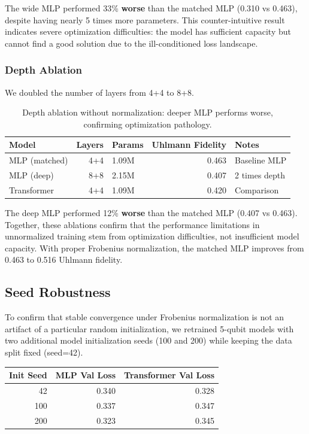 \documentclass[11pt]{article}
\begin{document}
The wide MLP performed 33\% \textbf{worse} than the matched MLP (0.310 vs 0.463), despite having nearly 5 times more parameters. This counter-intuitive result indicates severe optimization difficulties: the model has sufficient capacity but cannot find a good solution due to the ill-conditioned loss landscape.
\subsubsection{Depth Ablation}
\label{sec:orgd9ea408}

We doubled the number of layers from 4+4 to 8+8.

\begin{table}[htbp]
\caption{\label{tab:org05a20d6}Depth ablation without normalization: deeper MLP performs worse, confirming optimization pathology.}
\centering
\begin{tabular}{lrlrl}
Model & Layers & Params & Uhlmann Fidelity & Notes\\
\hline
MLP (matched) & 4+4 & 1.09M & 0.463 & Baseline MLP\\
MLP (deep) & 8+8 & 2.15M & 0.407 & 2 times depth\\
Transformer & 4+4 & 1.09M & 0.420 & Comparison\\
\end{tabular}
\end{table}

The deep MLP performed 12\% \textbf{worse} than the matched MLP (0.407 vs 0.463). Together, these ablations confirm that the performance limitations in unnormalized training stem from optimization difficulties, not insufficient model capacity. With proper Frobenius normalization, the matched MLP improves from 0.463 to 0.516 Uhlmann fidelity.
\subsection{Seed Robustness}
\label{sec:org8323e8f}
To confirm that stable convergence under Frobenius normalization is not an artifact of a particular random initialization, we retrained 5-qubit models with two additional model initialization seeds (100 and 200) while keeping the data split fixed (seed=42).

\begin{center}
\begin{tabular}{rrr}
Init Seed & MLP Val Loss & Transformer Val Loss\\
\hline
42 & 0.340 & 0.328\\
100 & 0.337 & 0.347\\
200 & 0.323 & 0.345\\
\end{tabular}
\end{center}
\end{document}
